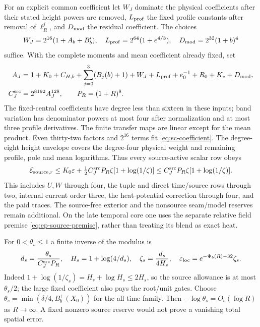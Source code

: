 For an explicit common coefficient let $W_J$ dominate the physical
coefficients after their stated height powers are removed, $L_{\rm prof}$
the fixed profile constants after removal of $\ell_R^j$, and $D_{\rm mod}$
the residual coefficient. The choices
\[
 W_J=2^{16}(1+A_b+B_b'),\quad
 L_{\rm prof}=2^{64}(1+e^{4/3}),\quad D_{\rm mod}=2^{32}(1+b)^4
\]
suffice. With the complete moments and mean coefficient already fixed, set
\begin{align}
 A_J={}&1+K_0+C_{H,b}+\sum_{j=0}^3(B_j(b)+1)+W_J+L_{\rm prof}
                        +e_0^{-1}+R_0+K_*+D_{\rm mod},\notag\\
 C_J^{\rm src}={}&2^{8192}A_J^{128},\qquad P_R=(1+R)^8.
 \label{eq:sc-coefficient}
\end{align}
The fixed-central coefficients have degree less than sixteen in these
inputs; band variation has denominator powers at most four after
normalization and at most three profile derivatives. The finite transfer
maps are linear except for the mean product. Even thirty-two factors
and $2^{16}$ terms fit \eqref{eq:sc-coefficient}. The degree-eight height
envelope covers the degree-four physical weight and remaining profile,
pole and mean logarithms. Thus every source-active scalar row obeys
\begin{equation}
 \mathcal E_{{\rm source},r}
 \le K_0\varepsilon+\tfrac12 C_J^{\rm src}P_R
                    \zeta[1+\log(1/\zeta)]
 \le C_J^{\rm src}P_R\zeta[1+\log(1/\zeta)].
 \label{eq:sc-source-map}
\end{equation}
This includes $U,W$ through four, the tuple and direct time/source rows
through two, internal current order three, the heat-potential correction
through four, and the paid traces. The source-free exterior and the
nonsource seam/model reserves remain additional. On the late temporal
core one uses the separate relative field premise
\eqref{eq:ep-source-premise}, rather than treating its blend as exact heat.

For $0<\theta_s\le1$ a finite inverse of the modulus is
\begin{equation}
 d_s=\frac{\theta_s}{C_J^{\rm src}P_R},\quad
 H_s=1+\log(4/d_s),\quad
 \zeta_s=\frac{d_s}{4H_s},\quad
 \varepsilon_{\rm loc}=e^{-\Psi_b(R)-32}\zeta_s.
 \label{eq:sc-tolerance}
\end{equation}
Indeed $1+\log(1/\zeta_s)=H_s+\log H_s\le2H_s$, so the
source allowance is at most $\theta_s/2$; the large fixed coefficient
also pays the root/unit gates. Choose
$\theta_s=\min(\delta/4,B_b^+(X_0))$ for the all-time family.
Then $-\log\theta_s=O_b(\log R)$ as $R\to\infty$. A fixed nonzero
source reserve would not prove a vanishing total spatial error.

